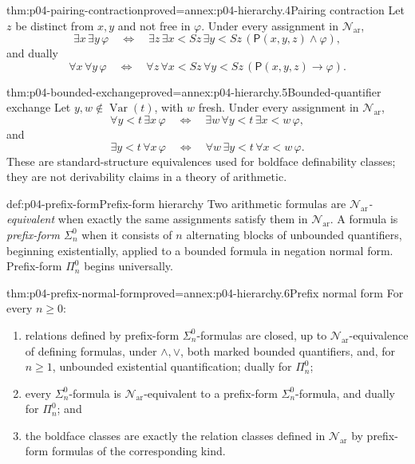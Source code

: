 \begin{hblemma}{thm:p04-pairing-contraction}{proved=annex:p04-hierarchy.4}{Pairing contraction}
Let \(z\) be distinct from \(x,y\) and not free in \(\varphi\).  Under every
assignment in \(\mathcal N_{\mathrm{ar}}\),
\[
 \exists x\,\exists y\,\varphi
 \quad\Leftrightarrow\quad
 \exists z\,\exists x<Sz\,\exists y<Sz\,
   (\mathsf P(x,y,z)\land\varphi),
\]
and dually
\[
 \forall x\,\forall y\,\varphi
 \quad\Leftrightarrow\quad
 \forall z\,\forall x<Sz\,\forall y<Sz\,
   (\mathsf P(x,y,z)\to\varphi).
\]
\end{hblemma}

\begin{hblemma}{thm:p04-bounded-exchange}{proved=annex:p04-hierarchy.5}{Bounded-quantifier exchange}
Let \(y,w\notin\operatorname{Var}(t)\), with \(w\) fresh.  Under every
assignment in \(\mathcal N_{\mathrm{ar}}\),
\[
 \forall y<t\,\exists x\,\varphi
 \quad\Leftrightarrow\quad
 \exists w\,\forall y<t\,\exists x<w\,\varphi,
\]
and
\[
 \exists y<t\,\forall x\,\varphi
 \quad\Leftrightarrow\quad
 \forall w\,\exists y<t\,\forall x<w\,\varphi.
\]
These are standard-structure equivalences used for boldface definability
classes; they are not derivability claims in a theory of arithmetic.
\end{hblemma}

\begin{hbdefinition}{def:p04-prefix-form}{Prefix-form hierarchy}
Two arithmetic formulas are \emph{\(\mathcal N_{\mathrm{ar}}\)-equivalent} when exactly
the same assignments satisfy them in \(\mathcal N_{\mathrm{ar}}\).  A formula is
\emph{prefix-form \(\Sigma^0_n\)} when it consists of \(n\) alternating
blocks of unbounded quantifiers, beginning existentially, applied to a bounded
formula in negation normal form.  Prefix-form \(\Pi^0_n\) begins universally.
\end{hbdefinition}

\begin{hbtheorem}{thm:p04-prefix-normal-form}{proved=annex:p04-hierarchy.6}{Prefix normal form}
For every \(n\geq0\):
\begin{enumerate}
 \item relations defined by prefix-form \(\Sigma^0_n\)-formulas are closed,
       up to \(\mathcal N_{\mathrm{ar}}\)-equivalence of defining formulas, under
       \(\land,\lor\), both marked bounded quantifiers, and, for \(n\geq1\),
       unbounded existential quantification; dually for \(\Pi^0_n\);
 \item every \(\Sigma^0_n\)-formula is \(\mathcal N_{\mathrm{ar}}\)-equivalent to a
       prefix-form \(\Sigma^0_n\)-formula, and dually for \(\Pi^0_n\); and
 \item the boldface classes are exactly the relation classes defined in
       \(\mathcal N_{\mathrm{ar}}\) by prefix-form formulas of the corresponding kind.
\end{enumerate}
\end{hbtheorem}

